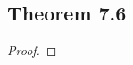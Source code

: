 \documentclass[../../main.tex]{subfiles}
\begin{document}
\subsection{Theorem 7.6}
\begin{wts}

\end{wts}
\begin{proof}

\end{proof}
\end{document}
